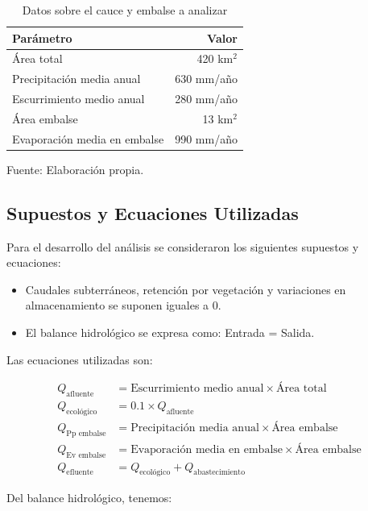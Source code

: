 \documentclass{article} %
\begin{document}
\begin{table}[h]
    \centering
    \caption{Datos sobre el cauce y embalse a analizar}
    \begin{tabular}{lr}
        \toprule
        \textbf{Parámetro} & \textbf{Valor} \\
        \midrule
        Área total & 420 km\(^2\) \\
        Precipitación media anual & 630 mm/año \\
        Escurrimiento medio anual & 280 mm/año \\
        Área embalse & 13 km\(^2\) \\
        Evaporación media en embalse & 990 mm/año \\
        \bottomrule
    \end{tabular}
    Fuente: Elaboración propia.
\end{table}

\subsection{Supuestos y Ecuaciones Utilizadas}

Para el desarrollo del análisis se consideraron los siguientes supuestos y ecuaciones:

\begin{itemize}
    \item Caudales subterráneos, retención por vegetación y variaciones en almacenamiento se suponen iguales a 0.
    \item El balance hidrológico se expresa como: Entrada = Salida.
\end{itemize}

Las ecuaciones utilizadas son:

\begin{align}
    Q_{\text{afluente}} &= \text{Escurrimiento medio anual} \times \text{Área total} \\
    Q_{\text{ecológico}} &= 0.1 \times Q_{\text{afluente}} \\
    Q_{\text{Pp embalse}} &= \text{Precipitación media anual} \times \text{Área embalse} \\
    Q_{\text{Ev embalse}} &= \text{Evaporación media en embalse} \times \text{Área embalse} \\
    Q_{\text{efluente}} &= Q_{\text{ecológico}} + Q_{\text{abastecimiento}}
\end{align}

Del balance hidrológico, tenemos:
\end{document}
